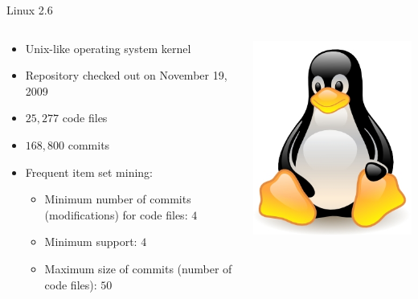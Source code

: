 \begin{frame}{Linux 2.6}
  \begin{columns}[c]
    \begin{column}{0.60\textwidth}
      \begin{itemize}
      \item Unix-like operating system kernel
      \item Repository checked out on November 19, 2009
      \item $25,277$ code files
      \item $168,800$ commits
      \item Frequent item set mining:
        \begin{itemize}
        \item Minimum number of commits (modifications) for code
          files: $4$
        \item Minimum support: $4$
        \item Maximum size of commits (number of code files): $50$
        \end{itemize}
      \end{itemize}
    \end{column}
    \begin{column}{0.40\textwidth}
      \includegraphics[width=\textwidth]{figures/linux-logo}
    \end{column}
  \end{columns}
\end{frame}

